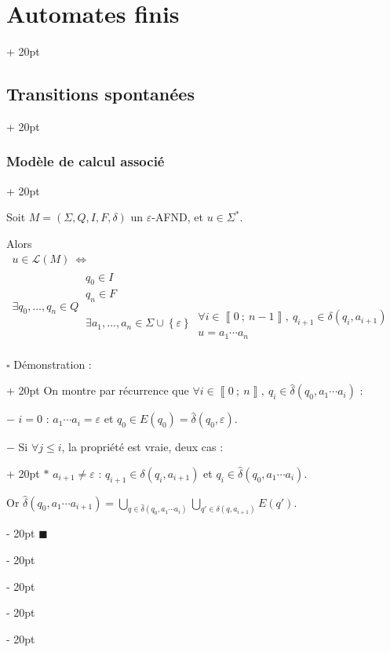 \documentclass[a4paper, 12pt, twoside]{article}
\newcommand{\nset}[2]{\left\llbracket #1\ ;\ #2 \right\rrbracket}
\newcommand{\set}[1]{\left\{ #1 \right\}}
\newcommand{\ssi}{\ \Leftrightarrow \ }
\renewcommand{\le}{\leqslant}
\newcommand{\ind}[1][20pt]{\advance\leftskip + #1}
\newcommand{\deind}[1][20pt]{\advance\leftskip - #1}
\newenvironment{indt}[2][20pt]{#2 \par \ind[#1]}{\par \deind} %
\newenvironment{proof}[1][{Démonstration :}]{\begin{indt}{$\square$ #1}}{$\blacksquare$ \end{indt}}
\begin{document}
\begin{indt}{\section{Automates finis}}
\begin{indt}{\subsection{Transitions spontanées}}
\begin{indt}{\subsubsection{Modèle de calcul associé}}
                \begin{emphBox}
                    Soit $M = (\Sigma, Q, I, F, \delta)$ un $\varepsilon$-AFND, et $u \in \Sigma^*$.

                    Alors
                    \[
                        \begin{array}{c}
                            u \in \mathcal L(M)
                            \ssi
                            \\
                            \exists q_0, \ldots, q_n \in Q\
                            \begin{array}{|l}
                                q_0 \in I
                                \\
                                q_n \in F
                                \\
                                \exists a_1, \ldots, a_n \in \Sigma \cup \set \varepsilon\
                                \begin{array}{|l}
                                    \forall i \in \nset 0 {n - 1},\ q_{i + 1} \in \delta(q_i, a_{i + 1})
                                    \\
                                    u = a_1 \cdots a_n
                                \end{array}
                            \end{array}
                        \end{array}
                    \]
                \end{emphBox}

                \vspace{12pt}
                
                \begin{proof}
                    \boxed{\Leftarrow} On montre par récurrence que $\forall i \in \nset 0 n,\ q_i \in \hat \delta(q_0, a_1 \cdots a_i)$ :

                    $-$ $i = 0$ : $a_1 \cdots a_i = \varepsilon$ et $q_0 \in E(q_0) = \hat \delta(q_0, \varepsilon)$.

                    \begin{indt}{$-$ Si $\forall j \le i$, la propriété est vraie, deux cas :}
                        $*$ $a_{i + 1} \neq \varepsilon$ : $q_{i + 1} \in \delta(q_i, a_{i + 1})$ et $q_i \in \hat \delta(q_0, a_1 \cdots a_i)$.

                        Or $\hat \delta (q_0, a_1 \cdots a_{i + 1}) = \displaystyle \bigcup_{q \in \hat \delta(q_0, a_1 \cdots a_i)} \bigcup_{q' \in \delta(q, a_{i + 1})} E(q')$.


\end{indt}
\end{proof}
\end{indt}
\end{indt}
\end{indt}
\end{document}

